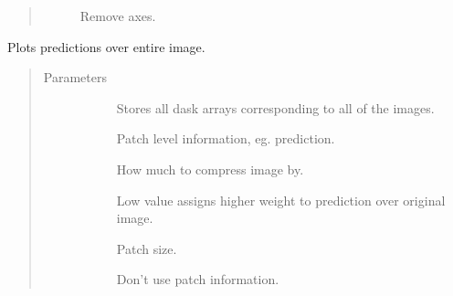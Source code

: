 \documentclass[letterpaper,10pt,english]{sphinxmanual}
\begin{document}
\begin{fulllineitems}
\begin{fulllineitems}
\begin{quote}
\begin{description}
\begin{description}
\item[{}] \leavevmode
Remove axes.

\end{description}

\end{description}\end{quote}

\end{fulllineitems}


\end{fulllineitems}


\begin{fulllineitems}
\label{\detokenize{index:pathflowai.visualize.PredictionPlotter}}
Plots predictions over entire image.
\begin{quote}\begin{description}
\item[{Parameters}] \leavevmode\begin{description}
\item[{}] \leavevmode
Stores all dask arrays corresponding to all of the images.

\item[{}] \leavevmode
Patch level information, eg. prediction.

\item[{}] \leavevmode
How much to compress image by.

\item[{}] \leavevmode
Low value assigns higher weight to prediction over original image.

\item[{}] \leavevmode
Patch size.

\item[{}] \leavevmode
Don’t use patch information.


\end{description}
\end{description}
\end{quote}
\end{fulllineitems}
\end{document}
